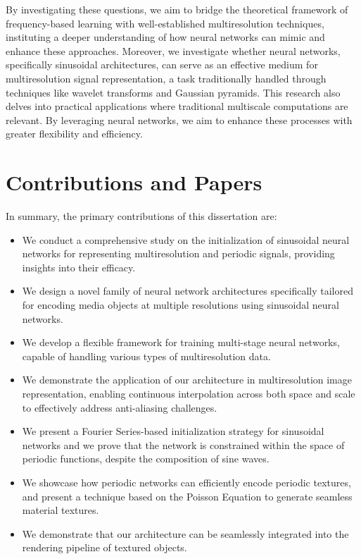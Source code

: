 By investigating these questions, we aim to bridge the theoretical framework of frequency-based learning with well-established multiresolution techniques, instituting a deeper understanding of how neural networks can mimic and enhance these approaches. Moreover, we investigate whether neural networks, specifically sinusoidal architectures, can serve as an effective medium for multiresolution signal representation, a task traditionally handled through techniques like wavelet transforms and Gaussian pyramids. This research also delves into practical applications where traditional multiscale computations are relevant. By leveraging neural networks, we aim to enhance these processes with greater flexibility and efficiency.


\section{Contributions and Papers}

In summary, the primary contributions of this dissertation are:

\begin{itemize}
    \item We conduct a comprehensive study on the initialization of sinusoidal neural networks for representing multiresolution and periodic signals, providing insights into their efficacy.
    \item We design a novel family of neural network architectures specifically tailored for encoding media objects at multiple resolutions using sinusoidal neural networks.
    \item We develop a flexible framework for training multi-stage neural networks, capable of handling various types of multiresolution data.
    \item We demonstrate the application of our architecture in multiresolution image representation, enabling continuous interpolation across both space and scale to effectively address anti-aliasing challenges.
    \item We present a Fourier Series-based initialization strategy for sinusoidal networks and we prove that the network is constrained within the space of periodic functions, despite the composition of sine waves.
    \item We showcase how periodic networks can efficiently encode periodic textures, and present a technique based on the Poisson Equation to generate seamless material textures.
    \item We demonstrate that our architecture can be seamlessly integrated into the  rendering pipeline of textured objects.
\end{itemize}


